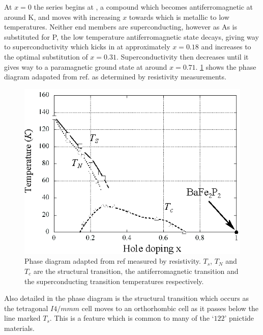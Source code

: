 At $x=0$ the \BaFePAs series begins at \BaFeAs, a compound which becomes antiferromagnetic at around \unit[138]{K}, and moves with increasing $x$ towards \BaFeP which is metallic to low temperatures. Neither end members are superconducting, however as As is substituted for P, the low temperature antiferromagnetic state decays, giving way to superconductivity which kicks in at approximately $x=0.18$ and increases to the optimal substitution of $x=0.31$. Superconductivity then decreases until it gives way to a paramagnetic ground state at around $x=0.71$. \Fig\ref{Fig:Intro:PhaseDiagram} shows the phase diagram adapated from ref. \cite{Nakai2010a} as determined by resistivity measurements. 
\begin{figure}[htbp]
    \begin{center}
        \includegraphics[scale=1.0]{Chapter-Introduction/Figures/PhaseDiagram/PhaseDiagram}
        \caption{Phase diagram adapted from ref \cite{Nakai2010a} measured by resistivity. $T_s$, $T_N$ and $T_c$ are the structural transition, the antiferromagnetic transition and the superconducting transition temperatures respectively.}
        \label{Fig:Intro:PhaseDiagram}
    \end{center}
\end{figure}
Also detailed in the phase diagram is the structural transition which occurs as the tetragonal $I4/mmm$ cell moves to an orthorhombic cell as it passes below the line marked $T_s$. This is a feature which is common to many of the `$122$' pnictide materials.

